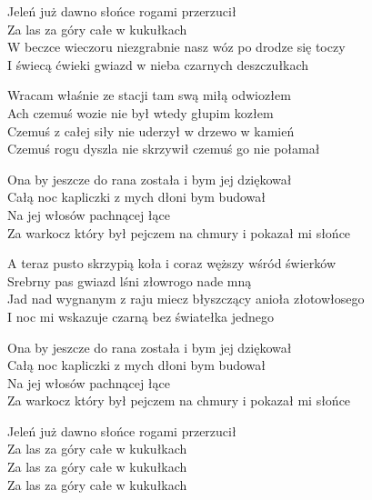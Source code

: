 \begin{text}
    \hfill\break
Jeleń już dawno słońce rogami przerzucił\\
Za las za góry całe w kukułkach\\
W beczce wieczoru niezgrabnie nasz wóz po drodze się toczy\\
I świecą ćwieki gwiazd w nieba czarnych deszczułkach

Wracam właśnie ze stacji tam swą miłą odwiozłem\\
Ach czemuś wozie nie był wtedy głupim kozłem\\
Czemuś z całej siły nie uderzył w drzewo w kamień\\
Czemuś rogu dyszla nie skrzywił czemuś go nie połamał

Ona by jeszcze do rana została i bym jej dziękował\\
Całą noc kapliczki z mych dłoni bym budował\\
Na jej włosów pachnącej łące\\
Za warkocz który był pejczem na chmury i pokazał mi słońce

A teraz pusto skrzypią koła i coraz węższy wśród świerków\\
Srebrny pas gwiazd lśni złowrogo nade mną\\
Jad nad wygnanym z raju miecz błyszczący anioła złotowłosego\\
I noc mi wskazuje czarną bez światełka jednego

Ona by jeszcze do rana została i bym jej dziękował\\
Całą noc kapliczki z mych dłoni bym budował\\
Na jej włosów pachnącej łące\\
Za warkocz który był pejczem na chmury i pokazał mi słońce

Jeleń już dawno słońce rogami przerzucił\\
Za las za góry całe w kukułkach\\
Za las za góry całe w kukułkach\\
Za las za góry całe w kukułkach
\end{text}
